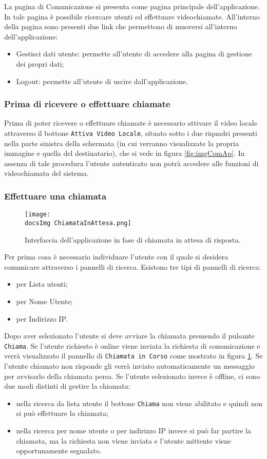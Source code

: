 {{La pagina di Comunicazione si presenta come pagina principale dell’applicazione. In tale pagina è possibile ricercare utenti ed effettuare videochiamate.
All’interno della pagina sono presenti due link che permettono di muoversi all’interno dell’applicazione:
\begin{itemize}
	\item Gestisci dati utente: permette all’utente di accedere alla pagina di gestione dei propri dati;
	\item Logout: permette all’utente di uscire dall’applicazione.
\end{itemize}
}

\subsubsection{Prima di ricevere o effettuare chiamate}{
Prima di poter ricevere o effettuare chiamate è necessario attivare il video locale attraverso il bottone \texttt{Attiva Video Locale}, situato sotto i due riquadri presenti nella parte sinistra della schermata (in cui verranno visualizzate la propria immagine e quella del destinatario), che si vede in figura \ref{fig:imgComAp}. In assenza di tale procedura l’utente autenticato non potrà accedere alle funzioni di videochiamata del sistema.
}

\subsubsection{Effettuare una chiamata}{
\begin{figure}[h!]
	\centering
		\texttt{[image: \\docsImg ChiamataInAttesa.png]}
		\caption{Interfaccia dell'applicazione in fase di chiamata in attesa di risposta.} 
		\label{fig:imgChAt}
	\end{figure}
	
Per prima cosa è necessario individuare l’utente con il quale si desidera comunicare attraverso i pannelli di ricerca. Esistono tre tipi di pannelli di ricerca:
\begin{itemize}
	\item per Lista utenti;
	\item per Nome Utente;
	\item per Indirizzo IP.
\end{itemize}
Dopo aver selezionato l'utente si deve avviare la chiamata premendo il pulsante \texttt{Chiama}.
Se l’utente richiesto è online viene inviata la richiesta di comunicazione e verrà visualizzato il pannello di \texttt{Chiamata in Corso} come mostrato in figura \ref{fig:imgChAt}. Se l'utente chiamato non risponde gli verrà inviato automaticamente un messaggio per avvisarlo della chiamata persa.
Se l’utente selezionato invece è offline, ci sono due modi distinti di gestire la chiamata:
\begin{itemize}
	\item nella ricerca da lista utente il bottone \texttt{Chiama} non viene abilitato e quindi non si può effettuare la chiamata;
	\item nella ricerca per nome utente o per indirizzo IP invece si può far partire la chiamata, ma la richiesta non viene inviata e l'utente mittente viene opportunamente segnalato.
\end{itemize}
}
\newpage
}
